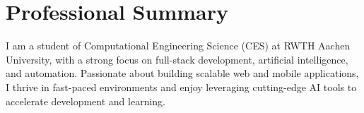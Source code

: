 \section{Professional Summary}

\begin{onecolentry}
I am a student of Computational Engineering Science (CES) at RWTH Aachen University, with a strong focus on full-stack development, artificial intelligence, and automation. Passionate about building scalable web and mobile applications, I thrive in fast-paced environments and enjoy leveraging cutting-edge AI tools to accelerate development and learning.
\end{onecolentry}
